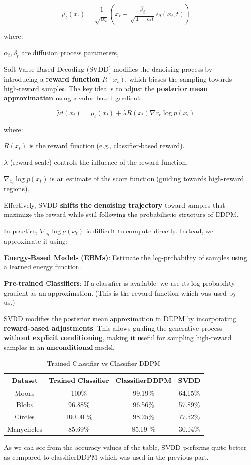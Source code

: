 \documentclass[a4paper,12pt]{article}
\begin{document}
\begin{equation}
\mu_t(x_t) = \frac{1}{\sqrt{\alpha_t}} \left( x_t - \frac{\beta_t}{\sqrt{1 - \bar{\alpha}t}} \epsilon_\theta(x_t, t) \right)
\end{equation}

where:

$\alpha_t, \beta_t$ are diffusion process parameters,

Soft Value-Based Decoding (SVDD) modifies the denoising process by introducing a \textbf{reward function} $R(x_t)$, which biases the sampling towards high-reward samples. The key idea is to adjust the \textbf{posterior mean approximation} using a value-based gradient:

\begin{equation}
\tilde{\mu}t(x_t) = \mu_t(x_t) + \lambda R(x_t) \nabla{x_t} \log p(x_t)
\end{equation}

where:

$R(x_t)$ is the reward function (e.g., classifier-based reward),

$\lambda$ (reward scale) controls the influence of the reward function,

$\nabla_{x_t} \log p(x_t)$ is an estimate of the score function (guiding towards high-reward regions).

Effectively, SVDD \textbf{shifts the denoising trajectory} toward samples that maximize the reward while still following the probabilistic structure of DDPM.

In practice, $\nabla_{x_t} \log p(x_t)$ is difficult to compute directly. Instead, we approximate it using:

\textbf{Energy-Based Models (EBMs)}: Estimate the log-probability of samples using a learned energy function.

\textbf{Pre-trained Classifiers}: If a classifier is available, we use its log-probability gradient as an approximation. (This is the reward function which was used by us.)

SVDD modifies the posterior mean approximation in DDPM by incorporating \textbf{reward-based adjustments}. This allows guiding the generative process \textbf{without explicit conditioning}, making it useful for sampling high-reward samples in an \textbf{unconditional} model.


\begin{table}[h]
  \centering
  \begin{tabular}{|c|c|c|c|}
      \hline
      {\bf Dataset} & {\bf Trained Classifier} & {\bf ClassifierDDPM} & {\bf SVDD} \\
      \hline
      Moons & 100\% & 99.19\% & 64.15\% \\
      Blobs & 96.88\% & 96.56\% & 57.89\% \\
      Circles & 100.00 \% & 98.25\% & 77.62\% \\
      Manycircles & 85.69\% & 85.19 \% & 30.04\% \\
      \hline
  \end{tabular}
  \caption{Trained Classifier vs Classifier DDPM}
  \label{tab:classif}
\end{table}


As we can see from the accuracy values of the table, SVDD performs quite better as compared to classifierDDPM which was used in the previous part.
\end{document}
